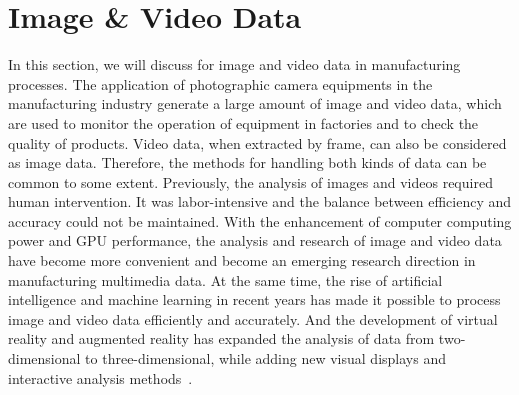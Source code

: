 \documentclass[a4paper,fleqn]{cas-dc}
\begin{document}
\section{Image \& Video Data}
In this section, we will discuss for image and video data in manufacturing processes.
The application of photographic camera equipments in the manufacturing industry generate a large amount of image and video data, which are used to monitor the operation of equipment in factories and to check the quality of products.
Video data, when extracted by frame, can also be considered as image data. Therefore, the methods for handling both kinds of data can be common to some extent.
Previously, the analysis of images and videos required human intervention. It was labor-intensive and the balance between efficiency and accuracy could not be maintained.
With the enhancement of computer computing power and GPU performance, the analysis and research of image and video data have become more convenient and become an emerging research direction in manufacturing multimedia data.
At the same time, the rise of artificial intelligence and machine learning in recent years has made it possible to process image and video data efficiently and accurately.
And the development of virtual reality and augmented reality has expanded the analysis of data from two-dimensional to three-dimensional, while adding new visual displays and interactive analysis methods~\cite{Yoo2021}.
\end{document}
